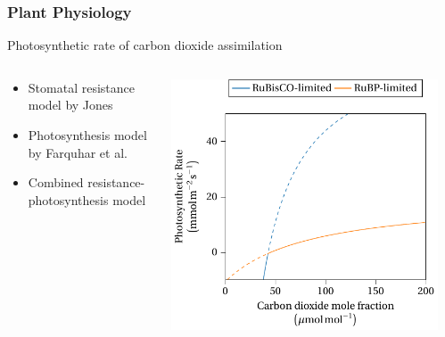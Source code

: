\begin{frame}
    \frametitle{Plant Physiology}
    \begin{center}
        Photosynthetic rate of carbon dioxide assimilation
    \end{center}
    \begin{columns}
        \begin{column}{0.4\textwidth}
            \begin{itemize}
                \item<2-> Stomatal resistance model by Jones 
                \item<3-> Photosynthesis model by Farquhar et al.
                \item<4> Combined resistance-photosynthesis model
            \end{itemize}
        \end{column}
        \begin{column}{0.6\textwidth}
            \vspace{0.5cm}
            \begin{columns}
                \begin{column}{0.3\textwidth}
                    \includegraphics[scale=0.33]{figures/photosynthesis.pdf}
                \end{column}
                \begin{column}{0.3\textwidth}
\end{column}
\end{columns}
\end{column}
\end{columns}
\end{frame}
